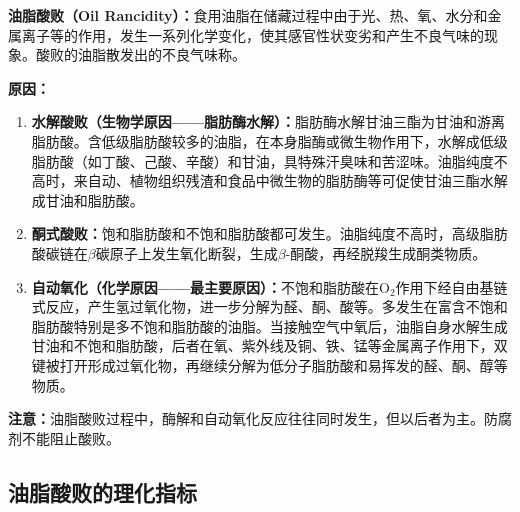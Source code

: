 \begin{keybox}
\difficulty \textbf{油脂酸败（Oil Rancidity）：}食用油脂在储藏过程中由于光、热、氧、水分和金属离子等的作用，发生一系列化学变化，使其感官性状变劣和产生不良气味的现象。酸败的油脂散发出的不良气味称。

\textbf{原因：}
\begin{enumerate}[leftmargin=*]
    \item \textbf{水解酸败（生物学原因——脂肪酶水解）：}脂肪酶水解甘油三酯为甘油和游离脂肪酸。含低级脂肪酸较多的油脂，在本身脂酶或微生物作用下，水解成低级脂肪酸（如丁酸、己酸、辛酸）和甘油，具特殊汗臭味和苦涩味。油脂纯度不高时，来自动、植物组织残渣和食品中微生物的脂肪酶等可促使甘油三酯水解成甘油和脂肪酸。
    \item \textbf{酮式酸败：}饱和脂肪酸和不饱和脂肪酸都可发生。油脂纯度不高时，高级脂肪酸碳链在$\beta$碳原子上发生氧化断裂，生成$\beta$-酮酸，再经脱羧生成酮类物质。
    \item \textbf{自动氧化（化学原因——最主要原因）：}不饱和脂肪酸在O$_2$作用下经自由基链式反应，产生氢过氧化物，进一步分解为醛、酮、酸等。多发生在富含不饱和脂肪酸特别是多不饱和脂肪酸的油脂。当接触空气中氧后，油脂自身水解生成甘油和不饱和脂肪酸，后者在氧、紫外线及铜、铁、锰等金属离子作用下，双键被打开形成过氧化物，再继续分解为低分子脂肪酸和易挥发的醛、酮、醇等物质。
\end{enumerate}

\textbf{注意：}油脂酸败过程中，酶解和自动氧化反应往往同时发生，但以后者为主。防腐剂不能阻止酸败。
\end{keybox}

\subsection{油脂酸败的理化指标}

